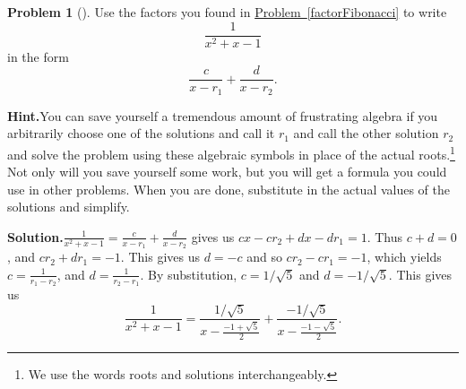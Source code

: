 \documentclass[10pt,]{book}
\theoremstyle{plain}
\theoremstyle{definition}
\newtheorem{activity}[project]{Problem}
\theoremstyle{definition}
\numberwithin{equation}{chapter}
\begin{document}
\begin{activity}[]\label{fractionFibonacci}
Use the factors you found in \hyperref[factorFibonacci]{Problem~\ref{factorFibonacci}} to write%
\begin{equation*}
\frac{1}{x^2+x-1}
\end{equation*}
in the form%
\begin{equation*}
\frac{c}{x-r_1} + \frac{d}{x-r_2}.
\end{equation*}
%
\par\medskip\noindent%
\textbf{Hint.}\quad You can save yourself a tremendous amount of frustrating algebra if you arbitrarily choose one of the solutions and call it \(r_1\) and call the other solution \(r_2\) and solve the problem using these algebraic symbols in place of the actual roots.\footnote{We use the words roots and solutions interchangeably.\label{fn-15}} Not only will you save yourself some work, but you will get a formula you could use in other problems. When you are done, substitute in the actual values of the solutions and simplify.%
\par\medskip\noindent%
\textbf{Solution.}\quad \(\frac{1}{x^2+x-1}=\frac{c}{x-r_1}+\frac{d}{x-r_2}\) gives us \(cx-cr_2+dx-dr_1=1\). Thus \(c+d=0\), and \(cr_2+dr_1 =-1\). This gives us \(d=-c\) and so \(cr_2-cr_1=-1\), which yields \(c=\frac{1}{r_1-r_2}\), and \(d=\frac{1}{r_2-r_1}\). By substitution, \(c=1/\sqrt{5}\) and \(d=-1/\sqrt{5}\). This gives us%
\begin{equation*}
\frac{1}{x^2+x-1} = \frac{1/\sqrt{5}}{x-\frac{-1+\sqrt{5}}{2}}
+ \frac{-1/\sqrt{5}}{x- \frac{-1-\sqrt{5}}{2}}\text{.}
\end{equation*}
%
\end{activity}
\end{document}
